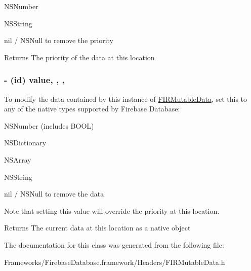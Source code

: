\begin{DoxyItemize}
\item N\+S\+Number
\item N\+S\+String
\item nil / N\+S\+Null to remove the priority
\end{DoxyItemize}

\begin{DoxyReturn}{Returns}
The priority of the data at this location 
\end{DoxyReturn}
\hypertarget{interface_f_i_r_mutable_data_ac3228205e697a0b5b8810311d9d3eb94}{}
\subsubsection[{value}]{\setlength{\rightskip}{0pt plus 5cm}-\/ (id) value\hspace{0.3cm}{\ttfamily [read]}, {\ttfamily [write]}, {\ttfamily [nonatomic]}, {\ttfamily [strong]}}\label{interface_f_i_r_mutable_data_ac3228205e697a0b5b8810311d9d3eb94}
To modify the data contained by this instance of \hyperlink{interface_f_i_r_mutable_data}{F\+I\+R\+Mutable\+Data}, set this to any of the native types supported by Firebase Database\+:


\begin{DoxyItemize}
\item N\+S\+Number (includes B\+O\+O\+L)
\item N\+S\+Dictionary
\item N\+S\+Array
\item N\+S\+String
\item nil / N\+S\+Null to remove the data
\end{DoxyItemize}

Note that setting this value will override the priority at this location.

\begin{DoxyReturn}{Returns}
The current data at this location as a native object 
\end{DoxyReturn}


The documentation for this class was generated from the following file\+:\begin{DoxyCompactItemize}
\item 
Frameworks/\+Firebase\+Database.\+framework/\+Headers/F\+I\+R\+Mutable\+Data.\+h\end{DoxyCompactItemize}
